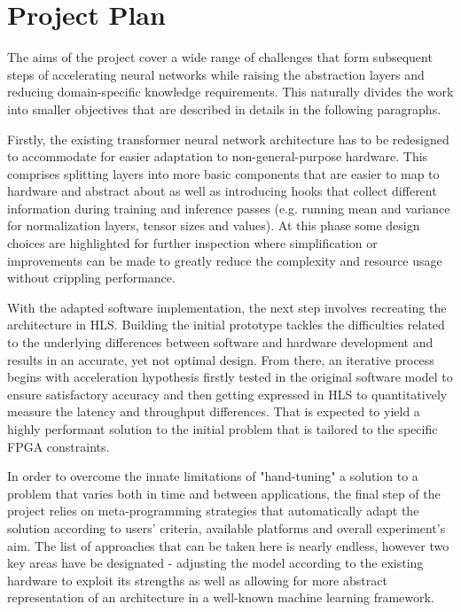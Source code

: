 \chapter{Project Plan}

The aims of the project cover a wide range of challenges that form subsequent steps of accelerating neural networks while raising the abstraction layers and reducing domain-specific knowledge requirements. This naturally divides the work into smaller objectives that are described in details in the following paragraphs.

Firstly, the existing transformer neural network architecture has to be redesigned to accommodate for easier adaptation to non-general-purpose hardware. This comprises splitting layers into more basic components that are easier to map to hardware and abstract about as well as introducing hooks that collect different information during training and inference passes (e.g. running mean and variance for normalization layers, tensor sizes and values). At this phase some design choices are highlighted for further inspection where simplification or improvements can be made to greatly reduce the complexity and resource usage without crippling performance.

With the adapted software implementation, the next step involves recreating the architecture in HLS. Building the initial prototype tackles the difficulties related to the underlying differences between software and hardware development and results in an accurate, yet not optimal design. From there, an iterative process begins with acceleration hypothesis firstly tested in the original software model to ensure satisfactory accuracy and then getting expressed in HLS to quantitatively measure the latency and throughput differences. That is expected to yield a highly performant solution to the initial problem that is tailored to the specific FPGA constraints.

In order to overcome the innate limitations of "hand-tuning" a solution to a problem that varies both in time and between applications, the final step of the project relies on meta-programming strategies that automatically adapt the solution according to users' criteria, available platforms and overall experiment's aim. The list of approaches that can be taken here is nearly endless, however two key areas have be designated - adjusting the model according to the existing hardware to exploit its strengths as well as allowing for more abstract representation of an architecture in a well-known machine learning framework.

